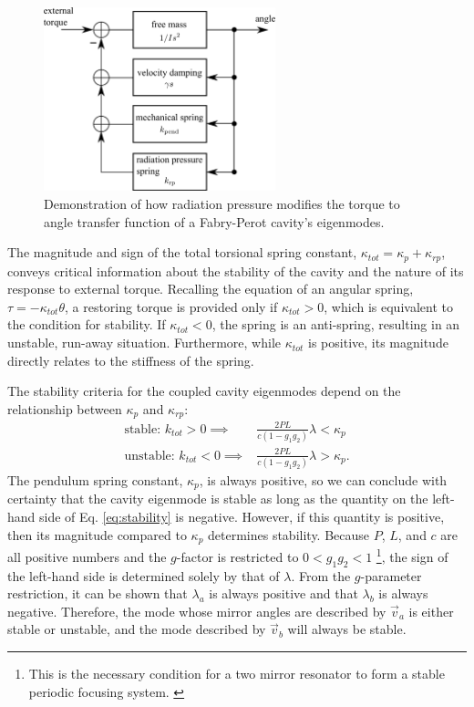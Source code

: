 \begin{figure}
\begin{centering}
\includegraphics[width=0.6\textwidth]{figures/pendulumLoop.pdf}
\caption[Controls view of addition of radiation pressure to the pendulum
transfer function]{Demonstration of how radiation pressure modifies the torque to
  angle transfer function of a Fabry-Perot cavity's eigenmodes.}
\label{fig:pendloop}
\end{centering}
\end{figure}

The magnitude and sign of the total torsional spring constant,
$\kappa_{tot} = \kappa_p + \kappa_{rp}$, conveys critical information
about the stability of the cavity and the nature of its response to
external torque. Recalling the equation of an angular spring, $\tau =
- \kappa_{tot} \theta$, a restoring torque is provided only if
$\kappa_{tot} > 0$, which is equivalent to the condition for
stability. If $\kappa_{tot} < 0$, the spring is an anti-spring,
resulting in an unstable, run-away situation. Furthermore, 
while $\kappa_{tot}$ is positive, its magnitude directly relates to
the stiffness of the spring.

The stability criteria for the coupled cavity eigenmodes 
depend on the relationship between $\kappa_p$ and $\kappa_{rp}$:
\begin{align}
\mbox{stable: } k_{tot} > 0 \implies & \frac{2 P L}{c (1-g_1 g_2)} \lambda < \kappa_p \\
\mbox{unstable: } k_{tot} < 0 \implies & \frac{2 P L}{c (1-g_1 g_2)} \lambda > \kappa_p.
\label{eq:stability}
\end{align}
The pendulum spring constant, $\kappa_p$, is always positive, so we
can conclude with certainty that the cavity eigenmode is stable as
long as the quantity on the left-hand side of Eq. \ref{eq:stability}
is negative. However, if this quantity is positive, then its magnitude
compared to $\kappa_p$ determines stability. Because $P$, $L$, and $c$
are all positive numbers and the $g$-factor is restricted to $0 < g_1g_2
< 1$ \footnote{This is the necessary condition for a two mirror
  resonator to form a stable periodic focusing
  system. \cite[p. 747]{Siegman1986Lasers}}, the sign of the left-hand
side is determined solely by that of $\lambda$. From the $g$-parameter
restriction, it can be shown that $\lambda_a$ is always positive and
that $\lambda_b$ is always negative. Therefore, the mode whose mirror
angles are described by $\vec{v}_a$ is either stable or unstable, and
the mode described by $\vec{v}_b$ will always be stable.

